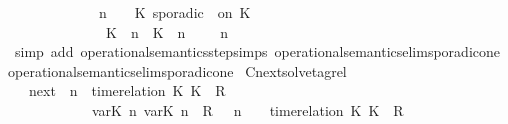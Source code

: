 \begin{isabellebody}
\ \ \ \ \ \ \ \ \ \ {\isasymsupseteq}\ {\isacharbraceleft}\ {\isasymGamma}{\isacharcomma}\ n\ {\isasymturnstile}\ {\isasymPsi}\ {\isasymtriangleright}\ {\isacharparenleft}{\isacharparenleft}K\ sporadic\ {\isasymtau}\ on\ K\ {\isacharhash}\ {\isasymPhi}{\isacharparenright}{\isacharcomma}\isanewline
\ \ \ \ \ \ \ \ \ \ \ \ \ \ {\isacharparenleft}{\isacharparenleft}K\ {\isasymUp}\ n{\isacharparenright}\ {\isacharhash}\ {\isacharparenleft}K\ {\isasymDown}\ n\ {\isacharat}\ {\isasymtau}{\isacharparenright}\ {\isacharhash}\ {\isasymGamma}{\isacharparenright}{\isacharcomma}\ n\ {\isasymturnstile}\ {\isasymPsi}\ {\isasymtriangleright}\ {\isasymPhi}\ {\isacharbraceright}{\isachardoublequoteclose}\isanewline
%
\isadelimproof
\ \ %
\endisadelimproof
%
\isatagproof
{}\isamarkupfalse%
\ {\isacharparenleft}simp\ add{\isacharcolon}\ operational{\isacharunderscore}semantics{\isacharunderscore}step{\isachardot}simps\ operational{\isacharunderscore}semantics{\isacharunderscore}elim{\isachardot}sporadic{\isacharunderscore}on{\isacharunderscore}e{}\ operational{\isacharunderscore}semantics{\isacharunderscore}elim{\isachardot}sporadic{\isacharunderscore}on{\isacharunderscore}e{}{\isacharparenright}%
\endisatagproof
{\isafoldproof}%
%
\isadelimproof
\isanewline
%
\endisadelimproof
\isanewline
{}\isamarkupfalse%
\ Cnext{\isacharunderscore}solve{\isacharunderscore}tagrel{\isacharcolon}\isanewline
\ \ \ {\isachardoublequoteopen}{\isacharparenleft}{\isasymC}\isactrlsub n\isactrlsub e\isactrlsub x\isactrlsub t\ {\isacharparenleft}{\isasymGamma}{\isacharcomma}\ n\ {\isasymturnstile}\ {\isacharparenleft}{\isacharparenleft}time{\isacharminus}relation\ {\isasymlfloor}K\ K\ {\isasymin}\ R{\isacharparenright}\ {\isacharhash}\ {\isasymPsi}{\isacharparenright}\ {\isasymtriangleright}\ {\isasymPhi}{\isacharparenright}{\isacharparenright}\isanewline
\ \ \ \ \ \ \ \ \ \ {\isasymsupseteq}\ {\isacharbraceleft}\ {\isacharparenleft}{\isacharparenleft}{\isasymlfloor}{\isasymtau}\isactrlsub v\isactrlsub a\isactrlsub r{\isacharparenleft}K\ n{\isacharparenright}{\isacharcomma}\ {\isasymtau}\isactrlsub v\isactrlsub a\isactrlsub r{\isacharparenleft}K\ n{\isacharparenright}{\isasymrfloor}\ {\isasymin}\ R{\isacharparenright}\ {\isacharhash}\ {\isasymGamma}{\isacharparenright}{\isacharcomma}\ n\ {\isasymturnstile}\ {\isasymPsi}\ {\isasymtriangleright}\ {\isacharparenleft}{\isacharparenleft}time{\isacharminus}relation\ {\isasymlfloor}K\ K\ {\isasymin}\ R{\isacharparenright}\ {\isacharhash}\ {\isasymPhi}{\isacharparenright}\ {\isacharbraceright}{\isachardoublequoteclose}\isanewline

\end{isabellebody}
